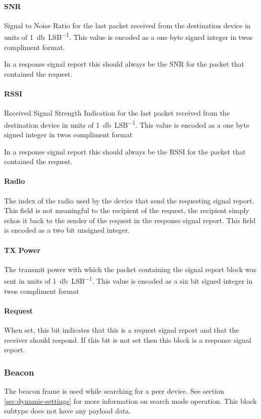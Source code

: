 \paragraph{SNR}
Signal to Noise Ratio for the last packet received from the destination device
in units of \SI{1}{\decibel\per LSB}. This value is encoded as a one
byte signed integer in twos compliment format.

In a response signal report this should always be the SNR for the packet that
contained the request.

\paragraph{RSSI}
Received Signal Strength Indication for the last packet received from the
destination device in units of \SI{1}{\decibel\per LSB}. This value is encoded
as a one byte signed integer in twos compliment format

In a response signal report this should always be the RSSI for the packet that
contained the request.

\paragraph{Radio}
The index of the radio used by the device that send the requesting signal
report. This field is not meaningful to the recipient of the request, the
recipient simply echos it back to the sender of the request in the response
signal report. This field is encoded as a two bit unsigned integer.

\paragraph{TX Power}
The transmit power with which the packet containing the signal report block was
sent in units of \SI{1}{\decibel\per LSB}. This value is encoded as a six bit
signed integer in twos compliment format

\paragraph{Request}
When set, this bit indicates that this is a request signal report and that the
receiver should respond. If this bit is not set then this block is a response
signal report.

\subsubsection{Beacon}
The beacon frame is used while searching for a peer device. See section
\ref{sec:dynamic-settings} for more information on search mode operation. This
block subtype does not have any payload data.

